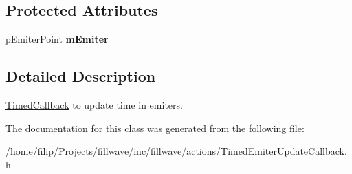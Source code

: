 \subsection*{Protected Attributes}
\begin{DoxyCompactItemize}
\item 
\hypertarget{classfillwave_1_1actions_1_1TimedEmiterUpdateCallback_a22f77613e47dabed63cd8678b8d978ff}{}p\+Emiter\+Point {\bfseries m\+Emiter}\label{classfillwave_1_1actions_1_1TimedEmiterUpdateCallback_a22f77613e47dabed63cd8678b8d978ff}

\end{DoxyCompactItemize}


\subsection{Detailed Description}
\hyperlink{classfillwave_1_1actions_1_1TimedCallback}{Timed\+Callback} to update time in emiters. 

The documentation for this class was generated from the following file\+:\begin{DoxyCompactItemize}
\item 
/home/filip/\+Projects/fillwave/inc/fillwave/actions/Timed\+Emiter\+Update\+Callback.\+h\end{DoxyCompactItemize}
